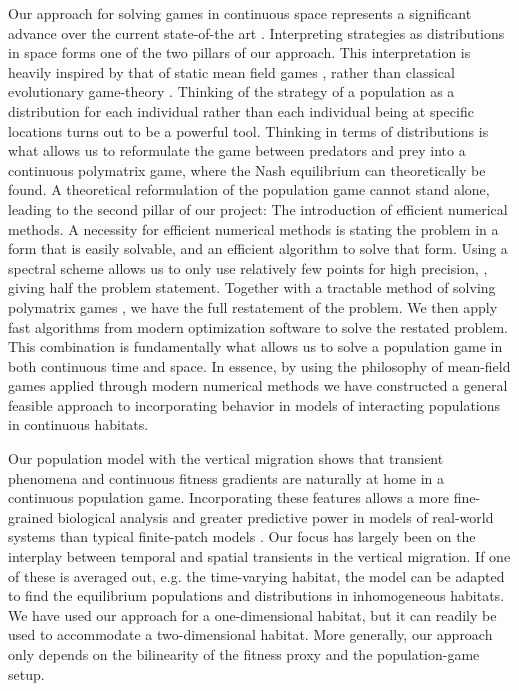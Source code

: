 Our approach for solving games in continuous space represents a significant advance over the current state-of-the art \citep{mariani2016migration, pinti2021co}. Interpreting strategies as distributions in space forms one of the two pillars of our approach. This interpretation is heavily inspired by that of static mean field games \citep{lasry2007mean, blanchet2016optimal}, rather than classical evolutionary game-theory \cite{hofbauer1998evolutionary}. Thinking of the strategy of a population as a distribution for each individual rather than each individual being at specific locations turns out to be a powerful tool. Thinking in terms of distributions is what allows us to reformulate the game between predators and prey into a continuous polymatrix game, where the Nash equilibrium can theoretically be found. A theoretical reformulation of the population game cannot stand alone, leading to the second pillar of our project: The introduction of efficient numerical methods. A necessity for efficient numerical methods is stating the problem in a form that is easily solvable, and an efficient algorithm to solve that form. Using a spectral scheme allows us to only use relatively few points for high precision, \citep{kopriva2009implementing}, giving half the problem statement. Together with a tractable method of solving polymatrix games \citep{miller1991copositive}, we have the full restatement of the problem. We then apply fast algorithms from modern optimization software \citep{Andersson2019, acary2019introduction} to solve the restated problem. This combination is fundamentally what allows us to solve a population game in both continuous time and space. In essence, by using the philosophy of mean-field games applied through modern numerical methods we have constructed a general feasible approach to incorporating behavior in models of interacting populations in continuous habitats.


Our population model with the vertical migration shows that transient phenomena and continuous fitness gradients \citep{kawecki2004conceptual} are naturally at home in a continuous population game. Incorporating these features allows a more fine-grained biological analysis and greater predictive power in models of real-world systems than typical finite-patch models \citep{kvrivan2008ideal, sadowski2019predator}. Our focus has largely been on the interplay between temporal and spatial transients in the vertical migration. If one of these is averaged out, e.g. the time-varying habitat, the model can be adapted to find the equilibrium populations and distributions in inhomogeneous habitats. We have used our approach for a one-dimensional habitat, but it can readily be used to accommodate a two-dimensional habitat. More generally, our approach only depends on the bilinearity of the fitness proxy and the population-game setup.


